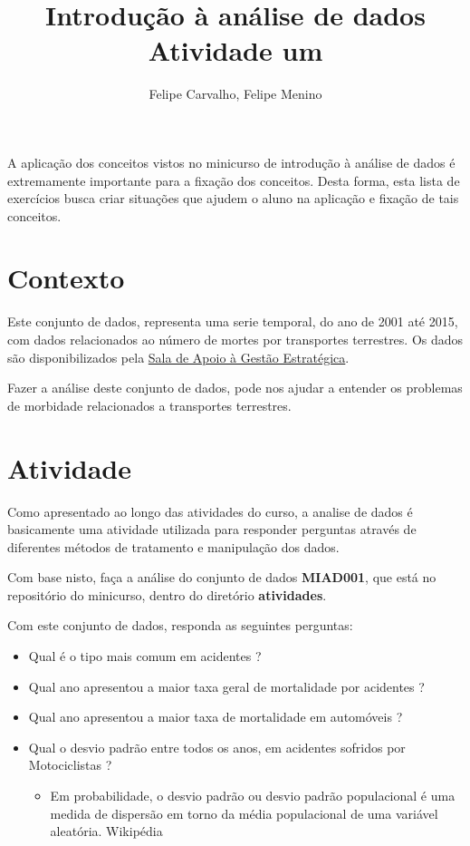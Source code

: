\documentclass[12pt]{article}
\title{Introdução à análise de dados\\ Atividade um}
\author{Felipe Carvalho\inst{1}, Felipe Menino\inst{1}}
\begin{document}
 

\maketitle
     
\begin{resumo} 
    A aplicação dos conceitos vistos no minicurso de introdução à análise de dados é extremamente importante para a fixação dos conceitos. Desta forma, esta lista de exercícios busca criar situações que ajudem o aluno na aplicação e fixação de tais conceitos.
\end{resumo}

\section{Contexto}

Este conjunto de dados, representa uma serie temporal, do ano de 2001 até 2015, com dados relacionados ao número de mortes por transportes terrestres. Os dados são disponibilizados pela \href{http://sage.saude.gov.br}{Sala de Apoio à Gestão Estratégica}.

Fazer a análise deste conjunto de dados, pode nos ajudar a entender os problemas de morbidade relacionados a transportes terrestres.

\section{Atividade}

Como apresentado ao longo das atividades do curso, a analise de dados é basicamente uma atividade utilizada para responder perguntas através de diferentes métodos de tratamento e manipulação dos dados.

Com base nisto, faça a análise do conjunto de dados \textbf{MIAD001}, que está no repositório do minicurso, dentro do diretório \textbf{atividades}.

Com este conjunto de dados, responda as seguintes perguntas:

\begin{itemize}
    \item Qual é o tipo mais comum em acidentes ?
    \item Qual ano apresentou a maior taxa geral de mortalidade por acidentes ?
    \item Qual ano apresentou a maior taxa de mortalidade em automóveis ?
    \item Qual o desvio padrão entre todos os anos, em acidentes sofridos por Motociclistas ?
    	\begin{itemize}
    		\item Em probabilidade, o desvio padrão ou desvio padrão populacional é uma medida de dispersão em torno da média populacional de uma variável aleatória. Wikipédia
    	\end{itemize}
\end{itemize}
\end{document}
